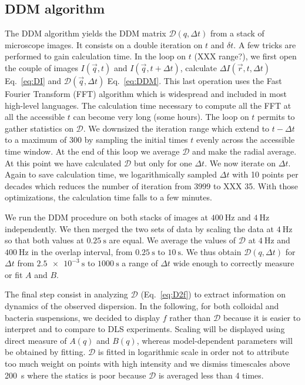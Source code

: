 \documentclass[prb,reprint,amsmath,amssymb]{revtex4-1}
\newcommand{\tg}[1]{{\color{magenta}#1}} %
\begin{document}
\subsection{DDM algorithm}

\tg{The DDM algorithm yields the DDM matrix $\mathcal{D}(q,\Delta t)$ from a stack of microscope images. It consists on a double iteration on $t$ and $\delta t$. A few tricks are performed to gain calculation time. In the loop on $t$ (XXX range?), we first open the couple of images $I(\vec{q},t)$ and $I(\vec{q},t+\Delta t)$, calculate $\Delta I(\vec{r},t, \Delta t)$  Eq.~\eqref{eq:DI} and $\mathcal{D}(\vec{q},\Delta t)$ Eq.~\eqref{eq:DDM}. This last operation uses the Fast Fourier Transform (FFT) algorithm which is widespread and included in most high-level languages. The calculation time necessary to compute all the FFT at all the accessible $t$ can become very long (some hours). The  loop on $t$ permits to gather statistics on $\mathcal{D}$. We downsized the iteration range which extend to $t-\Delta t$ to a maximum of 300 by sampling the initial times $t$  evenly across the accessible time window. At the end of this loop we average  $\mathcal{D}$ and make the radial average. At this point we have calculated $\mathcal{D}$ but only for one $\Delta t$. We now iterate on $\Delta t$. Again to save calculation time, we logarithmically sampled $\Delta t$ with 10 points per decades which reduces the number of iteration from 3999 to XXX 35. With those optimizations, the calculation time falls to a few minutes.

We run the DDM procedure on both stacks of images at $\SI{400}{\hertz}$ and $\SI{4}{\hertz}$ independently. We then merged the two sets of data by scaling the data at $\SI{4}{\hertz}$ so that both values at $\SI{0.25}{\second}$ are equal. We average the values of $\mathcal{D}$ at $\SI{4}{\hertz}$ and $\SI{400}{\hertz}$ in the overlap interval, from $\SI{0.25}{\second}$ to $\SI{10}{\second}$. We thus obtain $\mathcal{D} (q, \Delta t)$ for $\Delta t$ from $\SI{2.5e-3}{\second}$ to $\SI{1000}{\second}$ a range of $\Delta t$ wide enough to correctly measure or fit $A$ and $B$.

The final step consist in analyzing $\mathcal{D}$ (Eq.~\eqref{eq:D2f}) to extract information on dynamics of the observed dispersion. In the following, for both colloidal and bacteria suspensions, we decided to display $f$ rather than $\mathcal{D}$ because it is easier to interpret and to compare to DLS experiments. Scaling will be displayed using direct measure of $A(q)$ and $B(q)$, whereas model-dependent parameters will be obtained by fitting. $\mathcal{D}$ is fitted in logarithmic scale in order not to attribute too much weight on points with high intensity and we dismiss timescales above \SI{200}{\second} where the statics is poor because $\mathcal{D}$ is averaged less than 4 times.}
\end{document}
